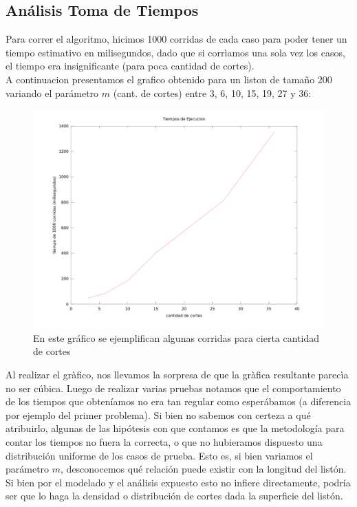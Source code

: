 \subsection{Análisis Toma de Tiempos}

\indent Para correr el algoritmo, hicimos 1000 corridas de cada caso para poder tener un tiempo estimativo en milisegundos, dado que si corrìamos una sola vez los casos, el tiempo era insignificante (para poca cantidad de cortes).\\
\indent A continuacion presentamos el grafico obtenido para un liston de tamaño 200 variando el parámetro $m$ (cant. de cortes) entre 3, 6, 10, 15, 19, 27 y 36:

\begin{figure}[h]
\centering                                                       
        \includegraphics[width=320pt]{./figs/p3tiempos.png}
	\caption{En este gráfico se ejemplifican algunas corridas para cierta cantidad de cortes}
	\label{fig:p3tiempos}
\end{figure}

\indent Al realizar el gràfico, nos llevamos la sorpresa de que la gràfica resultante parecìa no ser cúbica. Luego de realizar varias pruebas notamos que el comportamiento de los tiempos que obteníamos no era tan regular como esperábamos (a diferencia por ejemplo del primer problema). Si bien no sabemos con certeza a qué atribuirlo, algunas de las hipótesis con que contamos es que la metodología para contar los tiempos no fuera la correcta, o que no hubieramos dispuesto una distribución uniforme de los casos de prueba. Esto es, si bien variamos el parámetro $m$, desconocemos qué relación puede existir con la longitud del listón. Si bien por el modelado y el análisis expuesto esto no infiere directamente, podría ser que lo haga la densidad o distribución de cortes dada la superficie del listón.\\
